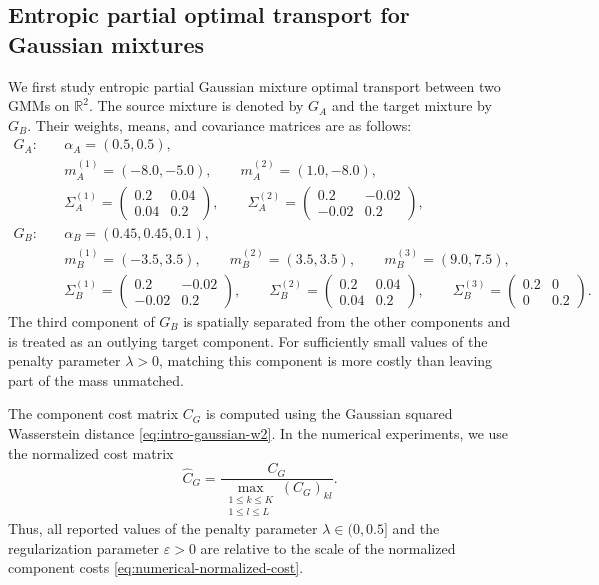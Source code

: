 \documentclass[a4paper,11pt]{article}
\numberwithin{equation}{section}
\newcommand{\eps}{\varepsilon}
\newcommand{\RR}{\mathbb{R}}
\begin{document}
\subsection{Entropic partial optimal transport for Gaussian mixtures}\label{subsec:numerics-epot}
We first study entropic partial Gaussian mixture optimal transport between two GMMs on $\RR^2$. The source mixture is denoted by $G_A$ and the target mixture by $G_B$. Their weights, means, and covariance matrices are as follows: 
\begin{equation*}
  \begin{aligned}
  G_A:\quad
  &\alpha_A=(0.5,0.5),\\
  &m_A^{(1)}=(-8.0,-5.0),
  \qquad
  m_A^{(2)}=(1.0,-8.0),\\
  &\Sigma_A^{(1)}
  =
  \begin{pmatrix}
    0.2 & 0.04\\
    0.04 & 0.2
  \end{pmatrix},
  \qquad
  \Sigma_A^{(2)}
  =
  \begin{pmatrix}
    0.2 & -0.02\\
    -0.02 & 0.2
  \end{pmatrix},\\[0.4em]
  G_B:\quad
  &\alpha_B=(0.45,0.45,0.1),\\
  &m_B^{(1)}=(-3.5,3.5),
  \qquad
  m_B^{(2)}=(3.5,3.5),
  \qquad
  m_B^{(3)}=(9.0,7.5),\\
  &\Sigma_B^{(1)}
  =
  \begin{pmatrix}
    0.2 & -0.02\\
    -0.02 & 0.2
  \end{pmatrix},
  \qquad
  \Sigma_B^{(2)}
  =
  \begin{pmatrix}
    0.2 & 0.04\\
    0.04 & 0.2
  \end{pmatrix},
  \qquad
  \Sigma_B^{(3)}
  =
  \begin{pmatrix}
    0.2 & 0\\
    0 & 0.2
  \end{pmatrix}.
  \end{aligned}
\end{equation*}
The third component of $G_B$ is spatially separated from the other components and is treated as an outlying target component. For sufficiently small values of the penalty parameter $\lambda>0$, matching this component is more costly than leaving part of the mass unmatched.

The component cost matrix $C_G$ is computed using the Gaussian squared Wasserstein distance \eqref{eq:intro-gaussian-w2}. In the numerical experiments, we use the normalized cost matrix
\begin{equation}\label{eq:numerical-normalized-cost}
  \widehat C_G = \frac{C_G}{\displaystyle \max_{\substack{1\leq k\leq K\\1\leq l\leq L}}(C_G)_{kl}}.
\end{equation}
Thus, all reported values of the penalty parameter $\lambda \in (0, 0.5]$ and the regularization parameter $\eps>0$ are relative to the scale of the normalized component costs \eqref{eq:numerical-normalized-cost}.
\end{document}
